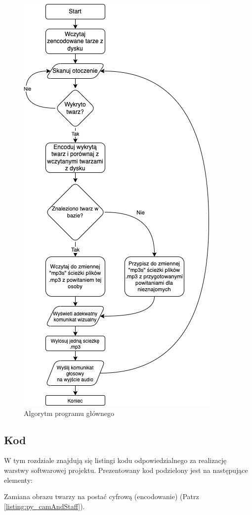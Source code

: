 \documentclass[a4paper,12pt,reqno]{article}
\begin{document}
\begin{figure}[H]%
\centering
\includegraphics[width=0.7\columnwidth]{imgs/glowny.drawio.jpg}
\caption{Algorytm programu głównego \label{algorytm_start_recognition}}
\quad
\end{figure}

\subsection{Kod}
W tym rozdziale znajdują się listingi kodu odpowiedzialnego za realizację warstwy softwarowej projektu.
Prezentowany kod podzielony jest na następujące elementy:\newline

Zamiana obrazu twarzy na postać cyfrową (encodowanie) (Patrz \ref{listing:py_camAndStaff}).
\end{document}
